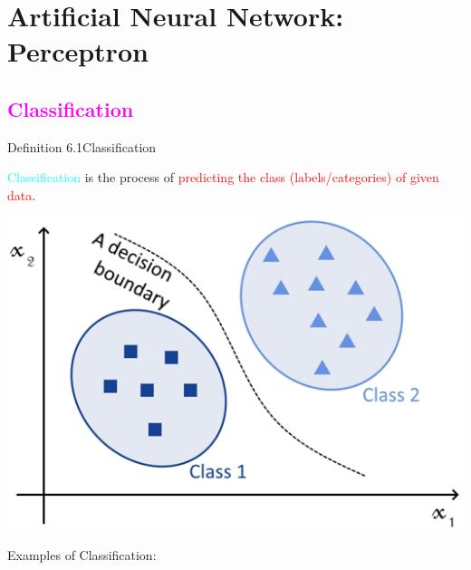 \documentclass{book}
\begin{document}
\chapter{Artificial Neural Network: Perceptron}
\textcolor{magenta}{\section{\textbf{Classification}}}
\begin{defBox}{Definition 6.1}{Classification}
    \raggedright
    \textcolor{cyan}{Classification} is the process of \textcolor{red}{predicting the class (labels/categories) of given data}.\\
    \begin{center}
        \includegraphics[scale=0.3]{chapter 6/ch6_figure1.jpeg}
    \end{center}
\end{defBox}
Examples of Classification:
\end{document}
